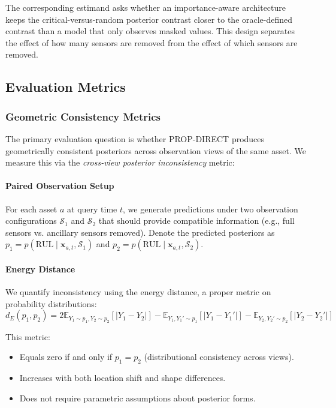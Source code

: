 The corresponding estimand asks whether an importance-aware architecture keeps the
critical-versus-random posterior contrast closer to the oracle-defined contrast than
a model that only observes masked values. This design separates the effect of how
many sensors are removed from the effect of which sensors are removed.

\subsection{Evaluation Metrics}
\label{sec:methods:metrics}

\subsubsection{Geometric Consistency Metrics}

The primary evaluation question is whether PROP-DIRECT produces geometrically consistent posteriors across observation views of the same asset. We measure this via the \emph{cross-view posterior inconsistency} metric:

\paragraph{Paired Observation Setup}
For each asset $a$ at query time $t$, we generate predictions under two observation configurations $\mathcal{S}_1$ and $\mathcal{S}_2$ that should provide compatible information (e.g., full sensors vs. ancillary sensors removed). Denote the predicted posteriors as $p_1 = p(\text{RUL} \mid \mathbf{x}_{a,t}, \mathcal{S}_1)$ and $p_2 = p(\text{RUL} \mid \mathbf{x}_{a,t}, \mathcal{S}_2)$.

\paragraph{Energy Distance}
We quantify inconsistency using the energy distance, a proper metric on probability distributions:
\[
d_E(p_1, p_2) = 2 \mathbb{E}_{Y_1 \sim p_1, Y_2 \sim p_2}[|Y_1 - Y_2|] - \mathbb{E}_{Y_1, Y_1' \sim p_1}[|Y_1 - Y_1'|] - \mathbb{E}_{Y_2, Y_2' \sim p_2}[|Y_2 - Y_2'|]
\]

This metric:
\begin{itemize}
    \item Equals zero if and only if $p_1 = p_2$ (distributional consistency across views).
    \item Increases with both location shift and shape differences.
    \item Does not require parametric assumptions about posterior forms.
\end{itemize}

